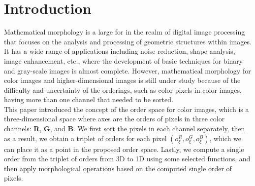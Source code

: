 \section*{Introduction}

Mathematical morphology is a large for in the realm of digital image processing that focuses on the analysis and processing of geometric structures within images. It has a wide range of applications including noise reduction, shape analysis, image enhancement, etc., where the development of basic techniques for binary and gray-scale images is almost complete. However, mathematical morphology for color images and higher-dimensional images is still under study because of the difficulty and uncertainty of the orderings, such as color pixels in color images, having more than one channel that needed to be sorted.\\

This paper introduced the concept of the order space for color images, which is a three-dimensional space where axes are the orders of pixels in three color channels: \textbf{R}, \textbf{G}, and \textbf{B}. We first sort the pixels in each channel separately, then as a result, we obtain a triplet of orders for each pixel $(o_{\xi}^{R}, o_{\xi}^{G}, o_{\xi}^{B})$, which we can place it as a point in the proposed order space. Lastly, we compute a single order from the triplet of orders from 3D to 1D using some selected functions, and then apply morphological operations based on the computed single order of pixels.

